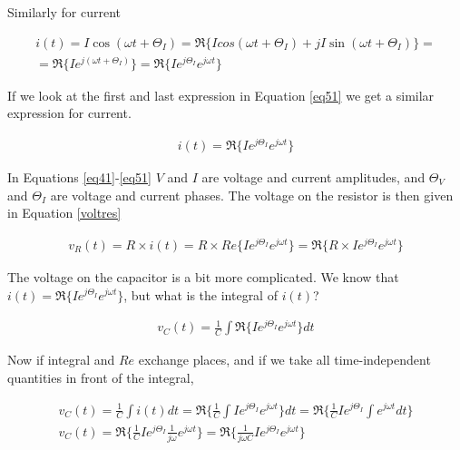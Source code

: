 \documentclass{ximera}
\begin{document}
\begin{example}
Similarly for current

\begin{eqnarray}
i(t)= I \cos (\omega t + \Theta_I) =\Re\{ I cos (\omega t + \Theta_I) + j I \sin (\omega t + \Theta_I)\}= \nonumber \\ =\Re\{I e^{j(\omega t + \Theta_I)}\}=\Re\{I e^{j \Theta_I} e^{j \omega t}\} \label{eq51} 
\end{eqnarray}




If we look at the first and last expression in Equation \ref{eq51} we get a similar expression for current.

\begin{eqnarray}
i(t)= \Re\{I e^{j \Theta_I} e^{j \omega t}\} \label{eq51a}
\end{eqnarray}



 In Equations  \ref{eq41}-\ref{eq51}    $V$ and $I$ are voltage and current amplitudes, and $\Theta_V $ and $\Theta_I$  are voltage and current phases. The voltage on the resistor is then given in Equation \ref{voltres} 

\begin{eqnarray}
v_R(t)=R \times  i(t) =  R \times  Re\{I e^{j \Theta_I} e^{j \omega t}\}  =   \Re\{R \times I e^{j \Theta_I} e^{j \omega t}\}   \label{voltres}
\end{eqnarray}

The voltage on the capacitor is a bit more complicated. We know that $i(t)=\Re\{I e^{j \Theta_I} e^{j \omega t}\}$, but what is the integral of $i(t)$?



\begin{eqnarray}
v_C(t) =  \frac{1}{C} \int \Re\{I e^{j \Theta_I} e^{j \omega t}\}  dt \label{eq6}
\end{eqnarray} 

Now if integral and $Re$ exchange places, and if we take all time-independent quantities in front of the integral,



\begin{eqnarray}
v_C(t) = \frac{1}{C} \int i(t) dt  =  \Re\{   \frac{1}{C} \int I e^{j \Theta_I} e^{j \omega t}\}  dt  = \Re\{   \frac{1}{C}  I e^{j \Theta_I} \int e^{j \omega t}dt \}   \label{eq7} \\
v_C(t)= \Re\{   \frac{1}{C}  I e^{j \Theta_I} \frac{1}{j \omega} e^{j \omega t}  \}   = \Re\{   \frac{1}{j \omega C}  I e^{j \Theta_I}  e^{j \omega t}  \}  \label{eq8}
\end{eqnarray} 





\end{example}
\end{document}
